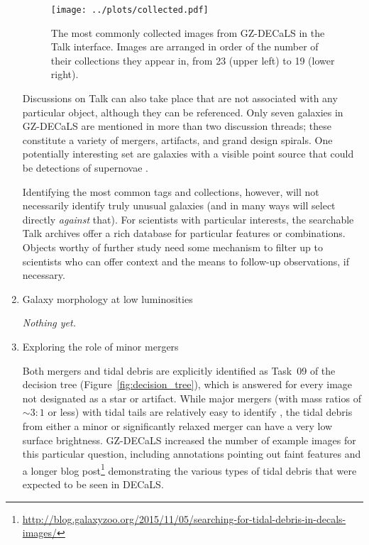 \documentclass[iop,apj,tighten]{emulateapj}
\begin{document}
\begin{enumerate}
\begin{figure}
\centering
\texttt{[image: ../plots/collected.pdf]}
\caption{The most commonly collected images from GZ-DECaLS in the Talk interface. Images are arranged in order of the number of their collections they appear in, from 23 (upper left) to 19 (lower right). \label{fig:collected}}
\end{figure}

Discussions on Talk can also take place that are not associated with any particular object, although they can be referenced. Only seven galaxies in GZ-DECaLS are mentioned in more than two discussion threads; these constitute a variety of mergers, artifacts, and grand design spirals. One potentially interesting set are galaxies with a visible point source that could be detections of supernovae \citep[such as \texttt{AGZ000atnd; see}][]{fri08}.

Identifying the most common tags and collections, however, will not necessarily identify truly unusual galaxies (and in many ways will select directly \emph{against} that). For scientists with particular interests, the searchable Talk archives offer a rich database for particular features or combinations. Objects worthy of further study need some mechanism to filter up to scientists who can offer context and the means to follow-up observations, if necessary. 

\item Galaxy morphology at low luminosities

\textit{Nothing yet.}

\item Exploring the role of minor mergers

Both mergers and tidal debris are explicitly identified as Task~09 of the decision tree (Figure~\ref{fig:decision_tree}), which is answered for every image not designated as a star or artifact. While major mergers (with mass ratios of $\sim3:1$ or less) with tidal tails are relatively easy to identify \citep{dar10a}, the tidal debris from either a minor or significantly relaxed merger can have a very low surface brightness. GZ-DECaLS increased the number of example images for this particular question, including annotations pointing out faint features and a longer blog post\footnote{\url{http://blog.galaxyzoo.org/2015/11/05/searching-for-tidal-debris-in-decals-images/}} demonstrating the various types of tidal debris that were expected to be seen in DECaLS. 


\end{enumerate}
\end{document}
